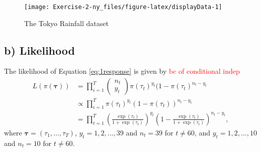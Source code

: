 \documentclass[
]{article}
\newenvironment{Shaded}{\begin{snugshade}}{\end{snugshade}}
\newcommand{\AttributeTok}[1]{\textcolor[rgb]{0.77,0.63,0.00}{#1}}
\newcommand{\DecValTok}[1]{\textcolor[rgb]{0.00,0.00,0.81}{#1}}
\newcommand{\DocumentationTok}[1]{\textcolor[rgb]{0.56,0.35,0.01}{\textbf{\textit{#1}}}}
\newcommand{\FunctionTok}[1]{\textcolor[rgb]{0.00,0.00,0.00}{#1}}
\newcommand{\NormalTok}[1]{#1}
\newcommand{\OtherTok}[1]{\textcolor[rgb]{0.56,0.35,0.01}{#1}}
\newcommand{\SpecialCharTok}[1]{\textcolor[rgb]{0.00,0.00,0.00}{#1}}
\newcommand{\StringTok}[1]{\textcolor[rgb]{0.31,0.60,0.02}{#1}}
\begin{document}
\begin{Shaded}
\end{Shaded}

\begin{figure}

{\centering \texttt{[image: Exercise-2-ny\_files/figure-latex/displayData-1]} 

}

\caption{The Tokyo Rainfall dataset}\label{fig:displayData}
\end{figure}

\hypertarget{b-likelihood}{%
\subsection{b) Likelihood}\label{b-likelihood}}

The likelihood of Equation \eqref{eq:1response} is given by \textcolor{red}{bc of conditional indep}
\[
\begin{array}{rl}
  L(\pi (\boldsymbol{\tau})) &= \prod_{i=1}^{T} \left(
  \begin{array}{c}
    n_t \\ y_t
  \end{array} \right)
  \pi(\tau_t)^{y_t}(1-\pi(\tau_t)^{n_t-y_t} 
  \\
  &\propto \prod_{i=1}^{T} \pi(\tau_t)^{y_t}(1-\pi(\tau_t))^{n_t-y_t} 
  \\
  &= \prod_{t=1}^{T} \left(\frac{\exp(\tau_t)}{1+\exp(\tau_t)}\right)^{y_t}
  \left( 1- \frac{\exp(\tau_t)}{1+\exp(\tau_t)}\right)^{n_t - y_t},
\end{array}
\]
where \(\boldsymbol{\tau} = (\tau_1,..., \tau_T)\), \(y_t = 1,2,...,39\) and \(n_t = 39\) for \(t \neq 60\), and \(y_t = 1,2,...,10\) and \(n_t = 10\) for \(t \neq 60\).
\end{document}
